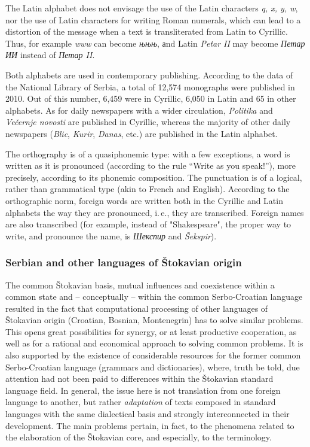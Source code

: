 \begin{multicols}{2}
The Latin alphabet does not envisage the use of the Latin characters \textit{q, x, y, w}, nor the use of Latin characters for writing Roman numerals, which can lead to a distortion of the message when a text is transliterated from Latin to Cyrillic.  Thus, for 
example \textit{www} can become \textit{њњњ}, аnd Latin \textit{Petar II} may become \textit{Петар ИИ} instead of \textit{Петар II}. 

Both alphabets are used in contemporary publishing. According to the data of the National Library of Serbia, a total of 12,574  monographs were published in 2010. Out of this number, 6,459 were in Cyrillic, 6,050 in Latin and 65 in other alphabets. As for daily newspapers with a wider circulation, \textit{Politika} and \textit{Večernje novosti} are published in Cyrillic, whereas the majority of other daily newspapers (\textit{Blic}, \textit{Kurir}, \textit{Danas}, etc.) are published in the Latin alphabet. 

The orthography is of a quasiphonemic type: with a few exceptions, a word is written as it is pronounced (according to the rule “Write as you speak!”), more precisely, according to its phonemic composition. 
The punctuation is of a logical, rather than grammatical type (akin to French and English).
According to the orthographic norm, foreign words are written both in the Cyrillic and Latin alphabets the way they are pronounced, i.\,e., they are transcribed. Foreign names are also transcribed (for example, instead of "Shakespeare", the proper way to write, and pronounce the name, is \textit{Шекспир} and \textit{Šekspir}).

\subsubsection {Serbian and other languages of Štokavian origin}

The common Štokavian basis, mutual influences and coexistence within a common state and – conceptually – within the common Serbo-Croatian language resulted in the fact that computational processing of other languages of Štokavian origin (Croatian, Bosnian, Montenegrin) has to solve similar problems. This opens great possibilities for synergy, or at least productive cooperation, as well as for a rational and economical approach to solving common problems. It is also supported by the existence of considerable resources for the former common Serbo-Croatian language (grammars and dictionaries), where, truth be told, due attention had not been paid to differences within the Štokavian standard language field. In general, the issue here is not translation from one foreign language to another, but rather \textit{adaptation} of texts composed in standard languages with the same dialectical basis and strongly interconnected in their development. 
The main problems pertain, in fact, to the phenomena related to the elaboration of the Štokavian core, and especially, to the terminology.


\end{multicols}
